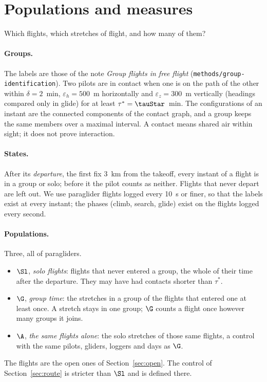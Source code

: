 \section{Populations and measures}\label{sec:populations}

Which flights, which stretches of flight, and how many of them?

\paragraph{Groups.} The labels are those of the note \emph{Group flights in free flight}
(\texttt{methods/group-identification}). Two pilots are in contact when one is on the path of the
other within $\delta=2$~min, $\varepsilon_h=500$~m horizontally and $\varepsilon_z=300$~m vertically
(headings compared only in glide) for at least $\tau^*=\tauStar$~min. The configurations of an instant
are the connected components of the contact graph, and a group keeps the same members over a maximal
interval. A contact means shared air within sight; it does not prove interaction.

\paragraph{States.} After its \emph{departure}, the first fix 3~km from the takeoff, every instant of a
flight is in a group or solo; before it the pilot counts as neither. Flights that never depart are
left out. We use paraglider flights logged every 10~s or finer, so that the labels exist at every
instant; the phases (climb, search, glide) exist on the flights logged every second.

\paragraph{Populations.} Three, all of paragliders.
\begin{itemize}
  \item $\Sl$, \emph{solo flights}: flights that never entered a group, the whole of their time after
        the departure. They may have had contacts shorter than $\tau^*$.
  \item $\G$, \emph{group time}: the stretches in a group of the flights that entered one at least
        once. A stretch stays in one group; $\G$ counts a flight once however many groups it joins.
  \item $\A$, \emph{the same flights alone}: the solo stretches of those same flights, a control with
        the same pilots, gliders, loggers and days as $\G$.
\end{itemize}
The flights are the open ones of Section~\ref{sec:open}. The control of Section~\ref{sec:route} is stricter
than $\Sl$ and is defined there.

